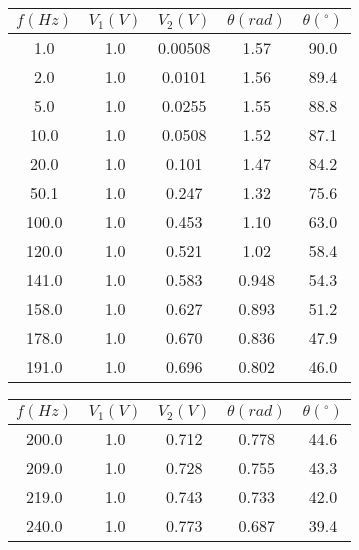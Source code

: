 \documentclass[12pt, a4paper, titlepage]{article}
\begin{document}
    \begin{table}[H]
      \begin{minipage}{0.49\textwidth}
        \centering
        \begin{tabular}{|c|c|c|c|c|}
          \hline
          \rowcolor[HTML]{EFEFEF} 
          $f (Hz)$  & $V_1 (V)$  & $V_2 (V)$    & $\theta (rad)$ & $\theta (^{\circ})$ \\ \hline
          1.0     & 1.0 & 0.00508 & 1.57    & 90.0          \\ \hline
          2.0     & 1.0 & 0.0101  & 1.56    & 89.4          \\ \hline
          5.0     & 1.0 & 0.0255  & 1.55    & 88.8          \\ \hline
          10.0    & 1.0 & 0.0508  & 1.52    & 87.1          \\ \hline
          20.0    & 1.0 & 0.101   & 1.47    & 84.2          \\ \hline
          50.1    & 1.0 & 0.247   & 1.32    & 75.6          \\ \hline
          100.0   & 1.0 & 0.453   & 1.10    & 63.0          \\ \hline
          120.0   & 1.0 & 0.521   & 1.02    & 58.4          \\ \hline
          141.0   & 1.0 & 0.583   & 0.948   & 54.3          \\ \hline
          158.0   & 1.0 & 0.627   & 0.893   & 51.2          \\ \hline
          178.0   & 1.0 & 0.670   & 0.836   & 47.9          \\ \hline
          191.0   & 1.0 & 0.696   & 0.802   & 46.0          \\ \hline
        \end{tabular}
      \end{minipage}
      \begin{minipage}{0.49\textwidth}
        \centering
        \begin{tabular}{|c|c|c|c|c|}
          \hline
          \rowcolor[HTML]{EFEFEF} 
          $f (Hz)$  & $V_1 (V)$  & $V_2 (V)$    & $\theta (rad)$ & $\theta (^{\circ})$ \\ \hline
          200.0   & 1.0 & 0.712   & 0.778   & 44.6          \\ \hline
          209.0   & 1.0 & 0.728   & 0.755   & 43.3          \\ \hline
          219.0   & 1.0 & 0.743   & 0.733   & 42.0          \\ \hline
          240.0   & 1.0 & 0.773   & 0.687   & 39.4          \\ \hline

\end{tabular}
\end{minipage}
\end{table}
\end{document}

